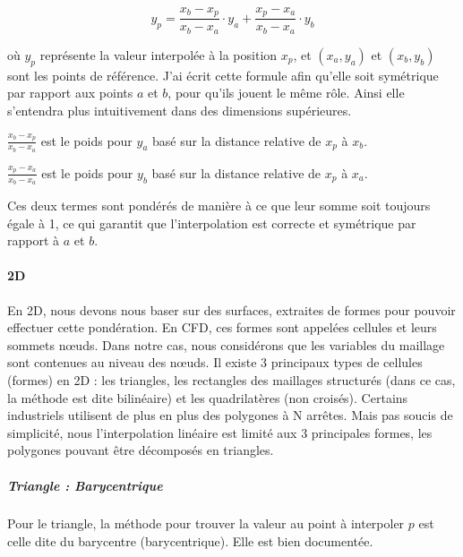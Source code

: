 \[
y_p = \frac{x_b - x_p}{x_b - x_a} \cdot y_a + \frac{x_p - x_a}{x_b - x_a} \cdot y_b
\]

où \( y_p \) représente la valeur interpolée à la position \( x_p \), et \((x_a, y_a)\) et \((x_b, y_b)\) sont les points de référence. J'ai écrit cette formule afin qu'elle soit symétrique par rapport aux points \( a \) et \( b \), pour qu'ils jouent le même rôle. Ainsi elle s'entendra plus intuitivement dans des dimensions supérieures.
\vspace{0.5cm}

        \( \frac{x_b - x_p}{x_b - x_a} \) est le poids pour \( y_a \) basé sur la distance relative de \( x_p \) à \( x_b \).

        \( \frac{x_p - x_a}{x_b - x_a} \) est le poids pour \( y_b \) basé sur la distance relative de \( x_p \) à \( x_a \).\vspace{0.5cm}

Ces deux termes sont pondérés de manière à ce que leur somme soit toujours égale à 1, ce
qui garantit que l'interpolation est correcte et symétrique par rapport à \( a \) et \( b \).\vspace{0.5cm}


\paragraph{2D}

\vspace{0.5cm}

En 2D, nous devons nous baser sur des surfaces, extraites de formes pour pouvoir effectuer cette pondération. En CFD, ces formes sont appelées cellules et leurs sommets nœuds. Dans notre cas, nous considérons que les variables du maillage sont contenues au niveau des nœuds. 
Il existe 3 principaux types de cellules (formes) en 2D : les triangles, les rectangles des maillages structurés (dans ce cas, la méthode est dite bilinéaire) et les quadrilatères (non croisés).
Certains industriels utilisent de plus en plus des polygones à N arrêtes. Mais pas soucis de simplicité, nous l'interpolation linéaire est limité aux 3 principales formes, les polygones pouvant être décomposés en triangles.

\subparagraph{Triangle : Barycentrique}

Pour le triangle, la méthode pour trouver la valeur au point à interpoler \( p \) est celle dite du barycentre (barycentrique).
Elle est bien documentée.

